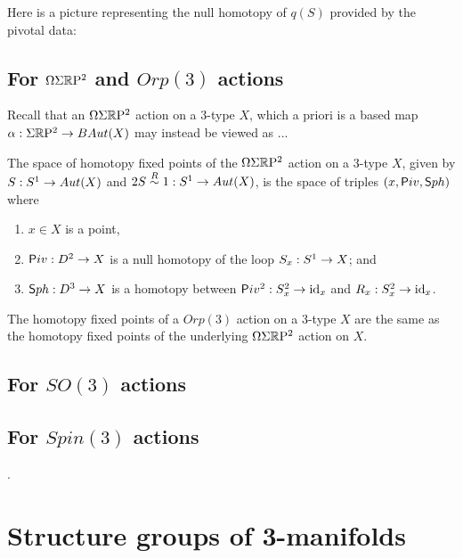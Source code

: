 \documentclass{amsart}
\begin{document}
Here is a picture representing the null homotopy of $q(S)$ provided by the pivotal data:


\subsection{For $\Omega \Sigma \mathbb R \mathrm{P}^2$ and $Orp(3)$ actions}

Recall that an $\Omega \Sigma \mathbb R \mathrm{P}^2$ action on a 3-type $X$, which a priori is a based map $\alpha: \Sigma \mathbb R \mathrm{P}^2 \rightarrow BAut(X)$ may instead be viewed as ... 


\begin{proposition}
The space of homotopy fixed points of the $\Omega \Sigma \mathbb R \mathrm{P}^2$ action on a 3-type $X$, given by $S: S^1 \rightarrow Aut(X)$ and $2S \overset{R}{\sim} 1 : S^1 \rightarrow Aut(X)$, is the space of triples $(x, \mathsf Piv, \mathsf Sph)$ where
\begin{enumerate}
\item $x \in X$ is a point,
\item $\mathsf Piv: D^2 \rightarrow X$ is a null homotopy of the loop $S_x: S^1 \rightarrow X$; and
\item $\mathsf Sph: D^3 \rightarrow X$ is a homotopy between $\mathsf Piv^2 : S_x^2 \rightarrow \mathrm{id}_x$ and $R_x: S_x^2 \rightarrow \mathrm{id}_x$.
\end{enumerate}
\end{proposition}


\begin{proposition} \label{prop-quadvs2fp}
The homotopy fixed points of a $Orp(3)$ action on a 3-type $X$ are the same as the homotopy fixed points of the underlying $\Omega \Sigma \mathbb R \mathrm{P}^2$ action on $X$.
\end{proposition}



\subsection{For $SO(3)$ actions}

\subsection{For $Spin(3)$ actions} %
.
\appendix
\renewcommand{\thetheorem}{A.\arabic{theorem}}
\setcounter{theorem}{0}


\section{Structure groups of 3-manifolds} \label{sec-lft-struc}
\end{document}

